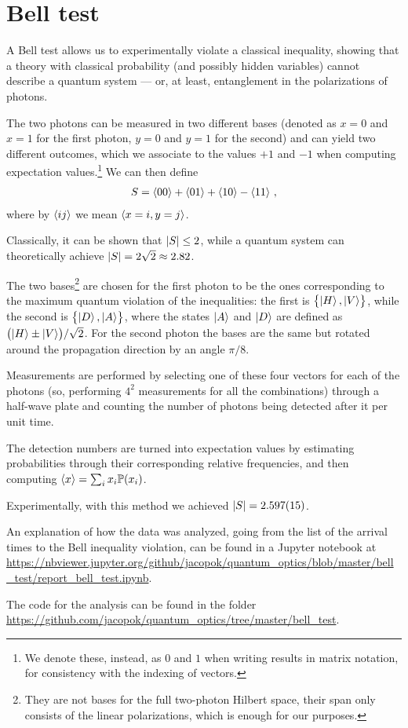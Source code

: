 \documentclass[main.tex]{subfiles}
\begin{document}
\section{Bell test}

A Bell test allows us to experimentally violate a classical inequality, showing that a theory with classical probability (and possibly hidden variables) cannot describe a quantum system --- or, at least, entanglement in the polarizations of photons. 

The two photons can be measured in two different bases (denoted as \(x=0\) and \(x=1\) for the first photon, \(y=0\) and \(y=1\) for the second) and can yield two different outcomes, which we associate to the values \(+1\) and \(-1\) when computing expectation values.\footnote{We denote these, instead, as \(0\) and \(1\) when writing results in matrix notation, for consistency with the indexing of vectors.} We can then define 
%
\begin{align}
S = \expval{00} + \expval{01}+ \expval{10} - \expval{11}
\,,
\end{align}
%
where by \(\expval{ij}\) we mean \(\expval{x=i, y=j}\). 

Classically, it can be shown \cite[]{clauserProposedExperimentTest1969} that \(\abs{S} \leq 2\), while a quantum system can theoretically achieve \(\abs{S} = 2 \sqrt{2} \approx \num{2.82}\). 

The two bases\footnote{They are not bases for the full two-photon Hilbert space, their span only consists of the linear polarizations, which is enough for our purposes. } are chosen for the first photon to be the ones corresponding to the maximum quantum violation of the inequalities: the first is \(\qty{\ket{H}, \ket{V}}\), while the second is \(\qty{\ket{D}, \ket{A}}\), where the states \(\ket{A}\) and \(\ket{D}\) are defined as \(\qty(\ket{H} \pm \ket{V}) / \sqrt{2}\).
For the second photon the bases are the same but rotated around the propagation direction by an angle \(\pi /8\).

Measurements are performed by selecting one of these four vectors for each of the photons (so, performing \(4^2\) measurements for all the combinations) through a half-wave plate and counting the number of photons being detected after it per unit time. 

The detection numbers are turned into expectation values by estimating probabilities through their corresponding relative frequencies, and then computing \(\expval{x} = \sum_i x_i \mathbb{P}(x_i)\). 

Experimentally, with this method we achieved \(\abs{S} = \num{2.597(15)}\).

An explanation of how the data was analyzed, going from the list of the arrival times to the Bell inequality violation, can be found in a Jupyter notebook at \url{https://nbviewer.jupyter.org/github/jacopok/quantum_optics/blob/master/bell_test/report_bell_test.ipynb}.

The code for the analysis can be found in the folder \url{https://github.com/jacopok/quantum_optics/tree/master/bell_test}. 
\end{document}
